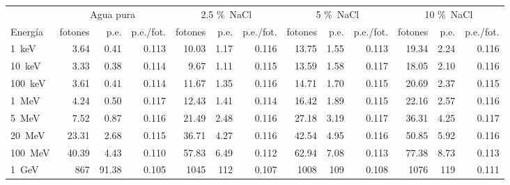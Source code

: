 \begin{tabular}{lrrrrrrrrrrrr}
\toprule
 & \multicolumn{3}{c}{Agua pura} & \multicolumn{3}{c}{2.5 \%~NaCl} & \multicolumn{3}{c}{5 \%~NaCl} & \multicolumn{3}{c}{10 \%~NaCl} \\
\cmidrule(lr){2-4}\cmidrule(lr){5-7}\cmidrule(lr){8-10}\cmidrule(lr){11-13}
Energía & fotones & p.e. & p.e./fot. & fotones & p.e. & p.e./fot. & fotones & p.e. & p.e./fot. & fotones & p.e. & p.e./fot. \\
\midrule
1~keV & 3.64 & 0.41 & 0.113 & 10.03 & 1.17 & 0.116 & 13.75 & 1.55 & 0.113 & 19.34 & 2.24 & 0.116 \\
10~keV & 3.33 & 0.38 & 0.114 & 9.67 & 1.11 & 0.115 & 13.59 & 1.58 & 0.117 & 18.05 & 2.10 & 0.116 \\
100~keV & 3.61 & 0.41 & 0.114 & 11.67 & 1.35 & 0.116 & 14.71 & 1.70 & 0.115 & 20.69 & 2.37 & 0.115 \\
1~MeV & 4.24 & 0.50 & 0.117 & 12.43 & 1.41 & 0.114 & 16.42 & 1.89 & 0.115 & 22.16 & 2.57 & 0.116 \\
5~MeV & 7.52 & 0.87 & 0.116 & 21.49 & 2.48 & 0.116 & 27.18 & 3.19 & 0.117 & 36.31 & 4.25 & 0.117 \\
20~MeV & 23.31 & 2.68 & 0.115 & 36.71 & 4.27 & 0.116 & 42.54 & 4.95 & 0.116 & 50.85 & 5.92 & 0.116 \\
100~MeV & 40.39 & 4.43 & 0.110 & 57.83 & 6.49 & 0.112 & 62.94 & 7.08 & 0.113 & 77.38 & 8.73 & 0.113 \\
1~GeV & 867 & 91.38 & 0.105 & 1045 & 112 & 0.107 & 1008 & 109 & 0.108 & 1076 & 119 & 0.111 \\
\bottomrule
\end{tabular}
